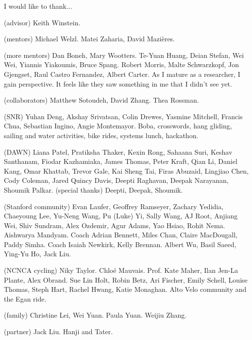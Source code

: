 I would like to thank...

(advisor)
Keith Winstein.

(mentors)
Michael Welzl.
Matei Zaharia, David Mazières.

(more mentors)
Dan Boneh, Mary Wootters.
Te-Yuan Huang, Deian Stefan, Wei Wei, Yiannis Yiakoumis, Bruce Spang.
Robert Morris, Malte Schwarzkopf, Jon Gjengset, Raul Castro Fernandez, Albert
Carter.
As I mature as a researcher, I gain perspective.
It feels like they saw something in me that I didn't see yet.

(collaborators) Matthew Sotoudeh, David Zhang. Thea Rossman.

(SNR) Yuhan Deng, Akshay Srivatsan, Colin Drewes,
Yasmine Mitchell, Francis Chua, Sebastian Ingino, Angie Montemayor.
Boba, crosswords, hang gliding, sailing and water activities, bike rides,
systems lunch, hackathon.

(DAWN) Liana Patel, Pratiksha Thaker, Kexin Rong, Sahaana Suri, Keshav
Santhanam, Fiodar Kazhamiaka, James Thomas, Peter Kraft, Qian Li, Daniel Kang,
Omar Khattab, Trevor Gale, Kai Sheng Tai, Firas Abuzaid, Lingjiao Chen, Cody
Coleman, Jared Quincy Davis, Deepti Raghavan, Deepak Narayanan, Shoumik Palkar.
(special thanks) Deepti, Deepak, Shoumik.

(Stanford community) Evan Laufer, Geoffrey Ramseyer, Zachary Yedidia, Chaeyoung
Lee, Yu-Neng Wang, Pu (Luke) Yi, Sally Wang, AJ Root, Anjiang Wei, Shiv
Sundram, Alex Ozdemir, Agur Adams, Yao Hsiao, Rohit Nema. Aishwarya Mandyam.
Coach Adrian Bennett, Miles Chan, Claire MacDougall, Paddy Simha.
Coach Isaiah Newkirk, Kelly Brennan. Albert Wu, Basil Saeed,
Ying-Yu Ho, Jack Liu.

(NCNCA cycling) Niky Taylor. Chloé Mauvais. Prof. Kate Maher, Ilan Jen-La
Plante, Alex Obrand. Sue Lin Holt, Robin Betz, Ari Fischer, Emily Schell,
Louise Thomas, Steph Hart, Rachel Hwang, Katie Monaghan. Alto Velo community
and the Egan ride.


(family)
Christine Lei, Wei Yuan. Paula Yuan. Weijiu Zhang.

(partner)
Jack Liu. Hanji and Tater.
